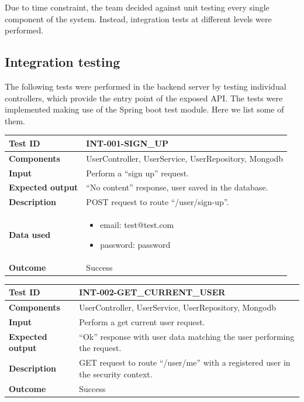 Due to time constraint, the team decided against unit testing every single component of the system. Instead, integration tests at different levels were performed.\\

\subsection{Integration testing}
The following tests were performed in the backend server by testing individual controllers, which provide the entry point of the exposed API. The tests were implemented making use of the Spring boot test module. Here we list some of them.\\

\begin{table}[H]
    \centering
    \begin{tabular}{p{3cm}p{10cm}}
    \textbf{Test ID} & INT-001-SIGN\_UP \\ \hline
    \textbf{Components} & UserController, UserService, UserRepository, Mongodb \\ \hline
    \textbf{Input} & Perform a “sign up” request. \\ \hline
    \textbf{Expected output} & “No content” response, user saved in the database. \\ \hline
    \textbf{Description} & POST request to route “/user/sign-up”. \\ \hline
    \textbf{Data used} & 
        \begin{itemize}[label={}] \itemsep0em
            \item email: test@test.com
            \item password: password
        \end{itemize} \\ \hline
    \textbf{Outcome} & Success \\ \hline
    \end{tabular}
\end{table}

\begin{table}[H]
    \centering
    \begin{tabular}{p{3cm}p{10cm}}
    \textbf{Test ID} & INT-002-GET\_CURRENT\_USER \\ \hline
    \textbf{Components} & UserController, UserService, UserRepository, Mongodb \\ \hline
    \textbf{Input} & Perform a get current user request. \\ \hline
    \textbf{Expected output} & “Ok” response with user data matching the user performing the request. \\ \hline
    \textbf{Description} & GET request to route “/user/me” with a registered user in the security context. \\ \hline
    \textbf{Outcome} & Success \\ \hline
    \end{tabular}
\end{table}

